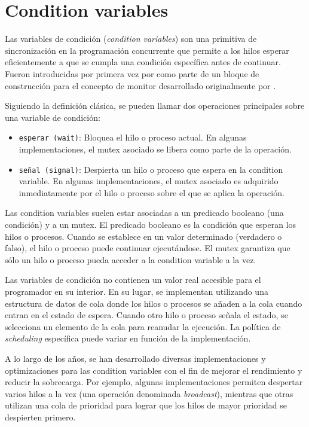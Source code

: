 \section{Condition variables}
\label{sec:condition-variables}

Las variables de condición (\textit{condition variables}) son una primitiva de sincronización en la programación concurrente
que permite a los hilos esperar eficientemente a que se cumpla una condición específica antes
de continuar. Fueron introducidas por primera vez por \cite{hoare1974monitors} como parte de un bloque
de construcción para el concepto de monitor desarrollado originalmente por \cite{hansen1973operating}.

Siguiendo la definición clásica, se pueden llamar dos operaciones principales sobre una variable de
condición:

\begin{itemize}
      \item \texttt{esperar (wait)}:
            Bloquea el hilo o proceso actual.
            En algunas implementaciones, el mutex asociado
            se libera como parte de la operación.
      \item \texttt{señal (signal)}:
            Despierta un hilo o proceso que espera en la condition variable. En algunas
            implementaciones, el mutex asociado es adquirido inmediatamente por el hilo o
            proceso sobre el que se aplica la operación.
\end{itemize}

Las condition variables suelen estar asociadas a un predicado booleano (una condición) y a
un mutex. El predicado booleano es la condición que esperan los hilos o procesos. Cuando se
establece en un valor determinado (verdadero o falso), el hilo o proceso puede continuar
ejecutándose. El mutex garantiza que sólo un hilo o proceso pueda acceder a la condition variable a la vez.

Las variables de condición no contienen un valor real accesible para el programador en su
interior. En su lugar, se implementan utilizando una estructura de datos de cola donde los hilos
o procesos se añaden a la cola cuando entran en el estado de espera. Cuando otro hilo o proceso
señala el estado, se selecciona un elemento de la cola para reanudar la ejecución. La política de
\textit{scheduling} específica puede variar en función de la implementación.

A lo largo de los años, se han desarrollado diversas implementaciones y optimizaciones para
las condition variables con el fin de mejorar el rendimiento y reducir la sobrecarga. Por
ejemplo, algunas implementaciones permiten despertar varios hilos a la vez (una operación
denominada \emph{broadcast}), mientras que otras utilizan una cola de prioridad para lograr que los
hilos de mayor prioridad se despierten primero.

